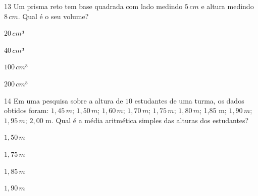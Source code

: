 \num{13} Um prisma reto tem base quadrada com lado medindo $5\,cm$ e altura
medindo $8\,cm$. Qual é o seu volume?

\begin{escolha}
\item $20\,cm$³
\item $40\,cm$³
\item $100\,cm$³
\item $200\,cm$³
\end{escolha}



\num{14} Em uma pesquisa sobre a altura de $10$ estudantes de uma turma, os
dados obtidos foram: $1,45\,m$; $1,50\,m$; $1,60\,m$; $1,70\,m$; $1,75\,m$; $1,80\,m$;
1,85 m; $1,90\,m$; $1,95\,m$; $2,00$ m. Qual é a média aritmética simples das
alturas dos estudantes?

\begin{escolha}
\item $1,50\,m$
\item $1,75\,m$
\item $1,85\,m$
\item $1,90\,m$
\end{escolha}

